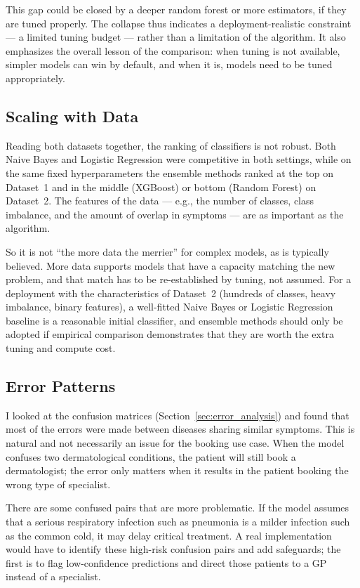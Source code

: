 This gap could be closed by a deeper random forest or more estimators, if they are tuned properly. The collapse thus indicates a deployment-realistic constraint --- a limited tuning budget --- rather than a limitation of the algorithm. It also emphasizes the overall lesson of the comparison: when tuning is not available, simpler models can win by default, and when it is, models need to be tuned appropriately.

\subsection{Scaling with Data}

Reading both datasets together, the ranking of classifiers is not robust. Both Naive Bayes and Logistic Regression were competitive in both settings, while on the same fixed hyperparameters the ensemble methods ranked at the top on Dataset~1 and in the middle (XGBoost) or bottom (Random Forest) on Dataset~2. The features of the data --- e.g., the number of classes, class imbalance, and the amount of overlap in symptoms --- are as important as the algorithm.

So it is not ``the more data the merrier'' for complex models, as is typically believed. More data supports models that have a capacity matching the new problem, and that match has to be re-established by tuning, not assumed. For a deployment with the characteristics of Dataset~2 (hundreds of classes, heavy imbalance, binary features), a well-fitted Naive Bayes or Logistic Regression baseline is a reasonable initial classifier, and ensemble methods should only be adopted if empirical comparison demonstrates that they are worth the extra tuning and compute cost.

\subsection{Error Patterns}

I looked at the confusion matrices (Section~\ref{sec:error_analysis}) and found that most of the errors were made between diseases sharing similar symptoms. This is natural and not necessarily an issue for the booking use case. When the model confuses two dermatological conditions, the patient will still book a dermatologist; the error only matters when it results in the patient booking the wrong type of specialist.

There are some confused pairs that are more problematic. If the model assumes that a serious respiratory infection such as pneumonia is a milder infection such as the common cold, it may delay critical treatment. A real implementation would have to identify these high-risk confusion pairs and add safeguards; the first is to flag low-confidence predictions and direct those patients to a GP instead of a specialist.


